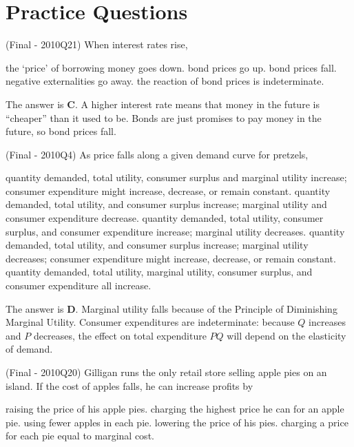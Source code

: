 \documentclass{exam}
\begin{document}
\section{Practice Questions}

\begin{questions}

\question (Final - 2010Q21) When interest rates rise, 

\begin{choices}
    \choice the ‘price’ of borrowing money goes down.
    \choice bond prices go up.
    \CorrectChoice bond prices fall.
    \choice negative externalities go away.
    \choice the reaction of bond prices is indeterminate.
\end{choices}

\begin{solution} The answer is \textbf{C}. A higher interest rate means that money in the future is ``cheaper'' than it used to be. Bonds are just promises to pay money in the future, so bond prices fall. \end{solution}

\question (Final - 2010Q4) As price falls along a given demand curve for pretzels,
\begin{choices}
\choice quantity demanded, total utility, consumer surplus and marginal utility increase; consumer
expenditure might increase, decrease, or remain constant.
\choice quantity demanded, total utility, and consumer surplus increase; marginal utility and consumer
expenditure decrease.
\choice quantity demanded, total utility, consumer surplus, and consumer expenditure increase; marginal
utility decreases.
\CorrectChoice quantity demanded, total utility, and consumer surplus increase; marginal utility decreases;
consumer expenditure might increase, decrease, or remain constant.
\choice quantity demanded, total utility, marginal utility, consumer surplus, and consumer expenditure all
increase.
\end{choices}

\begin{solution} The answer is \textbf{D}. Marginal utility falls because of the Principle of Diminishing Marginal Utility. Consumer expenditures are indeterminate: because $Q$ increases and $P$ decreases, the effect on total expenditure $PQ$ will depend on the elasticity of demand.\end{solution}

\question (Final - 2010Q20) Gilligan runs the only retail store selling apple pies on an island. If the cost of apples falls, he can increase
profits by 
\begin{choices}
\choice raising the price of his apple pies.
\choice charging the highest price he can for an apple pie.
\choice using fewer apples in each pie.
\CorrectChoice lowering the price of his pies.
\choice charging a price for each pie equal to marginal cost.
\end{choices}


\end{questions}
\end{document}
